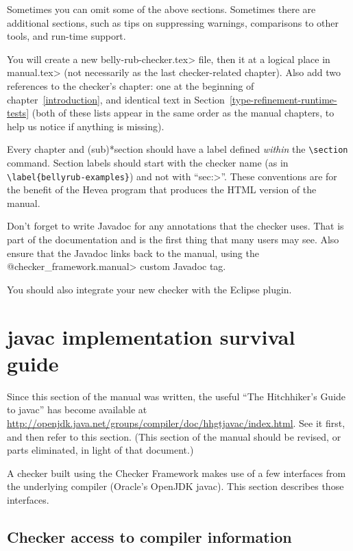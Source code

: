 Sometimes you can omit some of the above sections.  Sometimes there are
additional sections, such as tips on suppressing warnings, comparisons to
other tools, and run-time support.

You will create a new \<belly-rub-checker.tex> file,
then \verb|| it at a logical place in \<manual.tex> (not
necessarily as the last checker-related chapter).  Also add two references
to the checker's chapter:  one at the beginning of
chapter~\ref{introduction}, and identical text in
Section~\ref{type-refinement-runtime-tests} (both of these lists appear in
the same order as the manual chapters, to help us notice if anything is
missing).

Every chapter and (sub)*section should have a label defined \emph{within} the
\verb|\section| command.  Section labels should start with the checker
name (as in \verb|\label{bellyrub-examples}|) and not with ``\<sec:>''.
These conventions are for the benefit of the Hevea program that produces
the HTML version of the manual.

Don't forget to write Javadoc for any annotations that the checker uses.
That is part of the documentation and is the first thing that many users
may see.  Also ensure that the Javadoc links back to the manual, using the
\<@checker\_framework.manual> custom Javadoc tag.

You should also integrate your new checker with the Eclipse plugin.


\section{javac implementation survival guide\label{javac-tips}}

Since this section of the manual was written, the useful ``The Hitchhiker's
Guide to javac'' has become available at
\url{http://openjdk.java.net/groups/compiler/doc/hhgtjavac/index.html}.
See it first, and then refer to this section.  (This section of the manual
should be revised, or parts eliminated, in light of that document.)


A checker built using the Checker Framework makes use of a few interfaces
from the underlying compiler (Oracle's OpenJDK javac).
This section describes those interfaces.




\subsection{Checker access to compiler information\label{compiler-information}}

